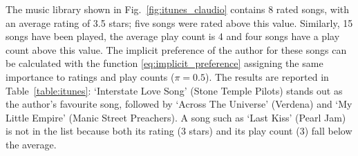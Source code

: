 \begin{example}
The music library shown in Fig.~\ref{fig:itunes_claudio} contains 8 rated songs, with an average rating of 3.5 stars; five songs were rated above this value.
Similarly, 15 songs have been played, the average play count is 4 and four songs have a play count above this value.
The implicit preference of the author for these songs can be calculated with the function \eqref{eq:implicit_preference} assigning the same importance to ratings and play counts ($\pi = 0.5$).
The results are reported in Table~\ref{table:itunes}:
`Interstate Love Song' (Stone Temple Pilots) stands out as the author's favourite song, followed by `Across The Universe' (Verdena) and `My Little Empire' (Manic Street Preachers). 
A song such as `Last Kiss' (Pearl Jam) is not in the list because both its rating (3 stars) and its play count (3) fall below the average.
\end{example}

